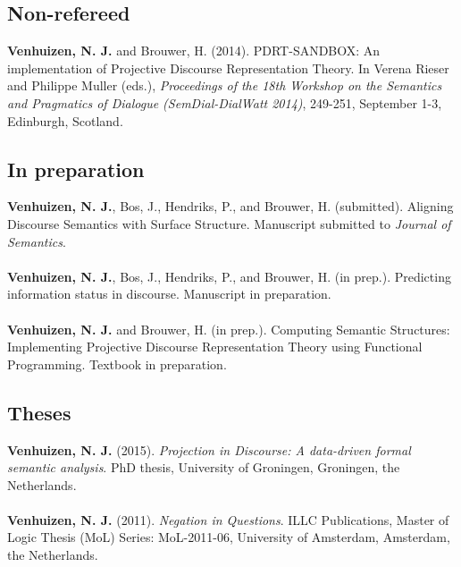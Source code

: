 \documentclass[a4paper,10pt]{article}
\begin{document}
\subsection*{Non-refereed}

\noindent
    \textbf{Venhuizen, N. J.} and Brouwer, H. (2014). PDRT-SANDBOX: An
    implementation of Projective Discourse Representation Theory. In Verena
    Rieser and Philippe Muller (eds.), \textit{Proceedings of the 18th
    Workshop on the Semantics and Pragmatics of Dialogue (SemDial-DialWatt
    2014)}, 249-251, September 1-3, Edinburgh, Scotland.

\subsection*{In preparation}

\noindent
    \textbf{Venhuizen, N. J.}, Bos, J., Hendriks, P., and Brouwer, H.
    (submitted). Aligning Discourse Semantics with Surface Structure.
    Manuscript submitted to \textit{Journal of Semantics}.\\
    \\
    \textbf{Venhuizen, N. J.}, Bos, J., Hendriks, P., and Brouwer, H. 
    (in prep.). Predicting information status in discourse. Manuscript in
    preparation.\\
    \\
    \textbf{Venhuizen, N. J.} and Brouwer, H. (in prep.). Computing Semantic
    Structures: Implementing Projective Discourse Representation Theory using
    Functional Programming. Textbook in preparation.

\subsection*{Theses}

\noindent
    \textbf{Venhuizen, N. J.} (2015). \textit{Projection in Discourse:
      A data-driven formal semantic analysis}. PhD thesis, University of
      Groningen, Groningen, the Netherlands.\\
    \\
    \textbf{Venhuizen, N. J.} (2011). \textit{Negation in Questions}.
      ILLC Publications, Master of Logic Thesis (MoL) Series: MoL-2011-06,
      University of Amsterdam, Amsterdam, the Netherlands.

\end{document}
